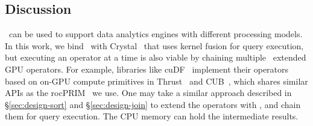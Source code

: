 \subsection{Discussion}
\THISWORK\ can be used to support data analytics engines with different processing models.
In this work, we bind \THISWORK\ with Crystal~\cite{crystal-sigmod-20} that uses kernel fusion for query execution, but executing an operator at a time is also viable by chaining multiple \THISWORK\ extended GPU operators. 
For example, libraries like cuDF~\cite{cudf} implement their operators
based on on-GPU compute primitives in Thrust~\cite{Thrust} and CUB~\cite{cub}, which shares similar APIs as the rocPRIM~\cite{rocprim} we use. 
One may take a similar approach described in \S\ref{sec:design-sort} and \S\ref{sec:design-join} to extend the operators with \THISWORK, and chain them for query execution.
The CPU memory can hold the intermediate results.














